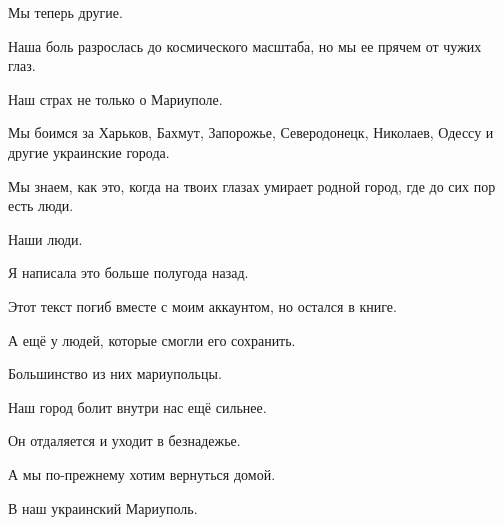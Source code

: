 Мы теперь другие. 

Наша боль разрослась до космического масштаба, но мы ее прячем от чужих глаз. 

Наш страх  не только о  Мариуполе. 

Мы боимся  за Харьков, Бахмут,  Запорожье,  Северодонецк, Николаев, Одессу и
другие украинские города. 

Мы знаем, как это, когда на твоих глазах умирает родной город, где до сих пор
есть люди. 

Наши люди.

Я написала это больше полугода назад. 

Этот текст погиб вместе с моим аккаунтом, но остался в книге. 

А ещё у людей, которые смогли его сохранить. 

Большинство из них мариупольцы. 

Наш город болит внутри нас ещё сильнее.  

Он отдаляется и уходит в безнадежье. 

А мы  по-прежнему хотим вернуться домой. 

В наш украинский Мариуполь.

